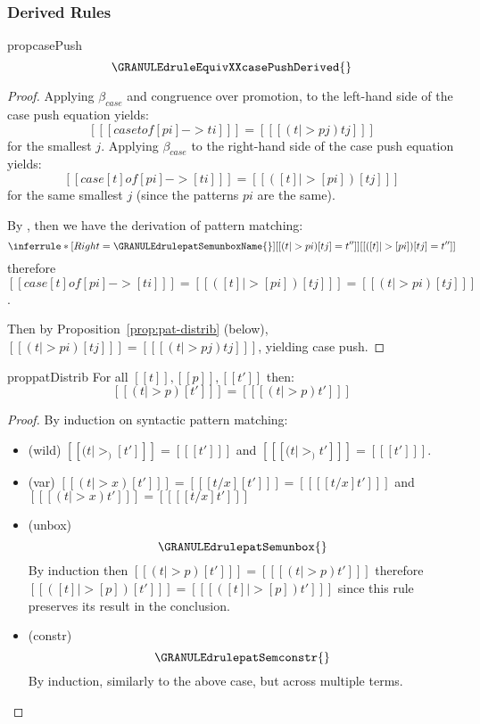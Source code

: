 \subsubsection{Derived Rules}

\begin{restatable}{prop}{casePush}
%
\[
\GRANULEdruleEquivXXcasePushDerived{}
\]
\end{restatable}

\begin{proof}
Applying $\beta_{case}$ and congruence over promotion, to the left-hand side
of the case push equation yields:
$$[[ [case t of [pi] -> ti] ]] = [[ [ (t |> pj) tj ] ]]$$
for the smallest $j$.
Applying $\beta_{case}$ to the right-hand side of the case
push equation yields:
$$[[ case [t] of [pi] -> [ti] ]] = [[ ([t] |> [pi]) [tj] ]]$$
for the same smallest $j$ (since the patterns $pi$ are the same).

By \GRANULEdrulepatSemunboxName{}, then we have the
derivation of pattern matching:
%
\[
\inferrule*[Right=\GRANULEdrulepatSemunboxName{}]
 {[[ ( t |> pi ) [tj] = t'' ]]}
 {[[ ( [ t ] |> [ pi ] ) [tj] = t'']]}
\]
%
therefore $[[ case [t] of [pi] -> [ti] ]] = [[ ([t] |> [pi]) [tj] ]] =
 [[ ( t |> pi ) [tj] ]]$.

Then by Proposition~\ref{prop:pat-distrib} (below),
$[[ ( t |> pi ) [tj] ]] = [[ [ (t |> pj) tj ] ]]$,
yielding case push.
\end{proof}

\begin{restatable}{prop}{patDistrib}
\label{prop:pat-distrib}
For all $[[ t ]], [[ p ]], [[ t' ]]$ then:
%
\[
[[ (t |> p) [t'] ]] = [[ [(t |> p) t'] ]]
\]
\end{restatable}

\begin{proof}
By induction on syntactic pattern matching:
\begin{itemize}
\item (wild) $[[ (t |> _) [t'] ]] = [[ [t'] ]]$
and $[[ [ (t |> _) t'] ]] = [[ [t'] ]]$.

\item (var) $[[ (t |> x) [t'] ]] = [[ [t / x] [t'] ]] = [[ { [ { [t / x] t'  } ] }
  ]]$
and $[[ [(t |> x) t' ] ]] = [[ {[ [t / x] t'  ]} ]]$

\item (unbox)
\[
\GRANULEdrulepatSemunbox{}
\]
%
By induction then $[[ (t |> p) [t'] ]] = [[ { [ (t |> p) t' ] } ]]$
therefore $[[ ([t] |> [p]) [t'] ]] = [[ { [ ([t] |> [p]) t' ] } ]]$
since this rule preserves its result in the conclusion.

\item (constr)
\[
\GRANULEdrulepatSemconstr{}
\]
%
By induction, similarly to the above case, but across
multiple terms.

\end{itemize}
\end{proof}

